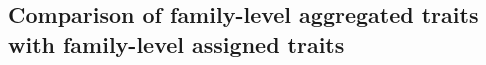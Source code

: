 \documentclass{article}
\begin{document}





\subsection*{Comparison of family-level aggregated traits with family-level assigned traits}


\end{document}
